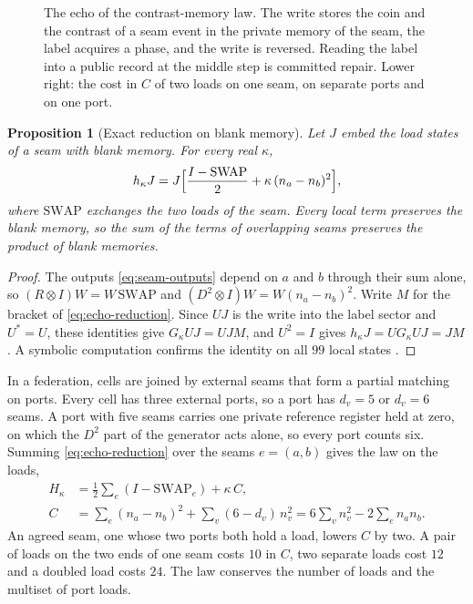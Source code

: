 \documentclass[11pt]{article}
\newtheorem{proposition}[theorem]{Proposition}
\theoremstyle{definition}
\theoremstyle{remark}
\begin{document}
\begin{figure}[!htb]
\centering

\caption{The echo of the contrast-memory law. The write stores the coin and the contrast of a seam event in the private memory of the seam, the label acquires a phase, and the write is reversed. Reading the label into a public record at the middle step is committed repair. Lower right: the cost in $C$ of two loads on one seam, on separate ports and on one port.}
\label{fig:echo}
\end{figure}

\begin{proposition}[Exact reduction on blank memory]
\label{prop:echo-reduction}
Let $J$ embed the load states of a seam with blank memory. For every real
$\kappa$,
\begin{equation}
 h_\kappa J=J\Bigl[\frac{I-\mathrm{SWAP}}{2}+\kappa\,(n_a-n_b)^2\Bigr],
\label{eq:echo-reduction}
\end{equation}
where $\mathrm{SWAP}$ exchanges the two loads of the seam. Every local
term preserves the blank memory, so the sum of the terms of overlapping
seams preserves the product of blank memories.
\end{proposition}

\begin{proof}
The outputs \eqref{eq:seam-outputs} depend on $a$ and $b$ through their
sum alone, so $(R\otimes I)W=W\,\mathrm{SWAP}$ and
$(D^2\otimes I)W=W(n_a-n_b)^2$. Write $M$ for the bracket of
\eqref{eq:echo-reduction}. Since $UJ$ is the write into the label sector
and $U^{*}=U$, these identities give $G_\kappa UJ=UJM$, and $U^2=I$ gives
$h_\kappa J=UG_\kappa UJ=JM$. A symbolic computation confirms the identity
on all $99$ local states \cite{ophmodel}.
\end{proof}

In a federation, cells are joined by external seams that form a partial
matching on ports. Every cell has three external ports, so a port has
$d_v=5$ or $d_v=6$ seams. A port with five seams carries one private
reference register held at zero, on which the $D^2$ part of the generator
acts alone, so every port counts six. Summing \eqref{eq:echo-reduction}
over the seams $e=(a,b)$ gives the law on the loads,
\begin{align}
 H_\kappa&=\frac12\sum_e(I-\mathrm{SWAP}_e)+\kappa\,C,
\label{eq:contrast-law}\\
 C&=\sum_e(n_a-n_b)^2+\sum_v(6-d_v)\,n_v^2
  =6\sum_vn_v^2-2\sum_en_an_b .
\label{eq:contrast-cost}
\end{align}
An agreed seam, one whose two ports both hold a load, lowers $C$ by two.
A pair of loads on the two ends of one seam costs $10$ in $C$, two
separate loads cost $12$ and a doubled load costs $24$. The law conserves
the number of loads and the multiset of port loads.
\end{document}
